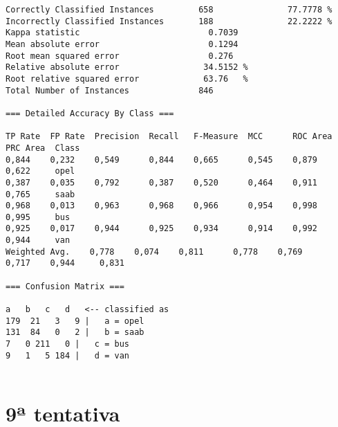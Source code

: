 \documentclass[
	article,			%
	11pt,				%
	oneside,			%
	a4paper,			%
	english,			%
	brazil,				%
	sumario=tradicional
	]{abntex2}
\begin{document}
\begin{lstlisting}
Correctly Classified Instances         658               77.7778 %
Incorrectly Classified Instances       188               22.2222 %
Kappa statistic                          0.7039
Mean absolute error                      0.1294
Root mean squared error                  0.276 
Relative absolute error                 34.5152 %
Root relative squared error             63.76   %
Total Number of Instances              846     

=== Detailed Accuracy By Class ===

TP Rate  FP Rate  Precision  Recall   F-Measure  MCC      ROC Area  PRC Area  Class
0,844    0,232    0,549      0,844    0,665      0,545    0,879     0,622     opel
0,387    0,035    0,792      0,387    0,520      0,464    0,911     0,765     saab
0,968    0,013    0,963      0,968    0,966      0,954    0,998     0,995     bus
0,925    0,017    0,944      0,925    0,934      0,914    0,992     0,944     van
Weighted Avg.    0,778    0,074    0,811      0,778    0,769      0,717    0,944     0,831     

=== Confusion Matrix ===

a   b   c   d   <-- classified as
179  21   3   9 |   a = opel
131  84   0   2 |   b = saab
7   0 211   0 |   c = bus
9   1   5 184 |   d = van


\end{lstlisting}

\section{9ª tentativa}
\end{document}
